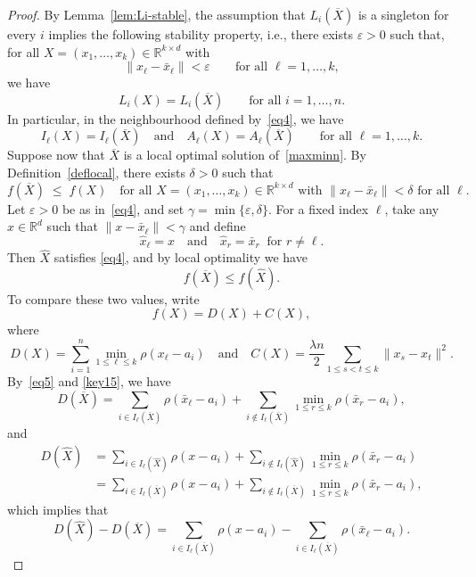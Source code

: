 \documentclass[11pt]{article}
\theoremstyle{definition}
\newcommand{\R}{\mathbb{R}}
\newcommand{\1}{\mathbf{1}}
\def\Bar{\overline}
\begin{document}
\begin{proof}
By Lemma~\ref{lem:Li-stable}, the assumption that $L_i(\Bar X)$ is a singleton
for every $i$ implies the following stability property, i.e., there exists
$\varepsilon>0$ such that, for all $X=(x_1,\dots,x_k)\in\R^{k\times d}$ with
\begin{equation}\label{eq4}
\|x_\ell-\bar x_\ell\|<\varepsilon\qquad\text{for all }\ell=1,\dots,k,
\end{equation}
we have
\begin{equation}\label{eq5}
L_i(X)=L_i(\Bar X)\qquad\text{for all }i=1,\dots,n.
\end{equation}
In particular, in the neighbourhood defined by~\eqref{eq4}, we have
\begin{equation}\label{key15}
    I_\ell(X)=I_\ell(\Bar X)
\quad\text{and}\quad
A_\ell(X)=A_\ell(\Bar X)
\qquad\text{for all }\ell=1,\dots,k.
\end{equation}
Suppose now that $\Bar X$ is a local optimal solution of~\eqref{maxminn}. 
By Definition~\ref{deflocal}, there exists $\delta>0$ such that
\[
f(\Bar X)\;\le\;f(X)
\quad
\text{for all }X=(x_1,\dots,x_k)\in\R^{k\times d}
\text{ with }\|x_\ell-\bar x_\ell\|<\delta
\text{ for all }\ell.
\]
Let $\varepsilon>0$ be as in~\eqref{eq4}, and set $
\gamma = \min\{\varepsilon,\delta\}.$
 For a fixed index $\ell$, take any $x\in\mathbb{R}^d$ such that $\|x-\bar x_\ell\| < \gamma$ and define 
 \[
\widehat x_\ell = x
\quad\text{and}\quad
\widehat x_r = \bar x_r \ \text{ for } r\neq\ell.
\]
Then $\widehat X$ satisfies \eqref{eq4}, and by local optimality we have
\begin{equation}\label{eq6}
f(\Bar X)\le f(\widehat X).
\end{equation}
To compare these two values, write
\begin{equation}\label{fDC}
f(X)=D(X)+C(X),    
\end{equation}
where
\[
D(X)=\sum_{i=1}^n\min_{1\le \ell\le k}\rho(x_\ell-a_i)
\quad\text{and}\quad
C(X)=\frac{\lambda n}{2}\sum_{1\le s<t\le k}\|x_s-x_t\|^2.
\]
 By~\eqref{eq5} and \eqref{key15}, we have
\begin{equation*}\label{eq:D-bar}
D(\Bar X)
=
\sum_{i\in I_\ell(\Bar X)}\rho(\bar x_\ell-a_i)
+
\sum_{i\notin I_\ell(\Bar X)}\min_{1\le r\le k}\rho(\bar x_r-a_i),
\end{equation*}
and
\begin{equation*}\label{eq:D-hat}
\begin{aligned}
     D(\widehat X)
     &=
\sum_{i\in I_\ell(\widehat X)}\rho(x-a_i)
+
\sum_{i\notin I_\ell(\widehat X)}\min_{1\le r\le k}\rho(\bar x_r-a_i) \\
     &=
\sum_{i\in I_\ell(\Bar X)}\rho(x-a_i)
+
\sum_{i\notin I_\ell(\Bar X)}\min_{1\le r\le k}\rho(\bar x_r-a_i),
\end{aligned}
\end{equation*}
which implies that
\begin{equation}\label{eq:D-diff}
D(\widehat X) - D(\Bar X) = \sum_{i\in I_\ell(\Bar X)} \rho(x-a_i) - \sum_{i\in I_\ell(\Bar X)} \rho(\bar x_\ell-a_i).
\end{equation}


\end{proof}
\end{document}
